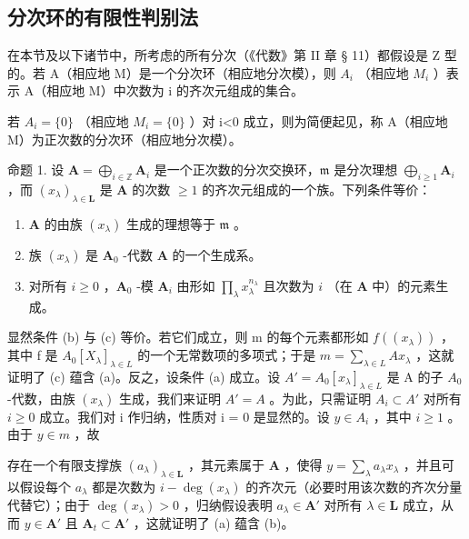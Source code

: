 \subsection{分次环的有限性判别法}

在本节及以下诸节中，所考虑的所有分次（《代数》第 II 章 § 11）都假设是 Z 型的。若 A（相应地 M）是一个分次环（相应地分次模），则 \(A_{i}\) （相应地 \(M_{i}\) ）表示 A（相应地 M）中次数为 i 的齐次元组成的集合。

若 \(A_{i}=\{0\}\) （相应地 \(M_{i}=\{0\}\) ）对 i\textless0 成立，则为简便起见，称 A（相应地 M）为正次数的分次环（相应地分次模）。

命题 1. 设 \(\mathbf{A} = \bigoplus_{i\in \mathbb{Z}}\mathbf{A}_i\) 是一个正次数的分次交换环，\(\mathfrak{m}\) 是分次理想 \(\bigoplus_{i\geqslant 1}\mathbf{A}_i\) ，而 \((x_{\lambda})_{\lambda \in \mathbf{L}}\) 是 \(\mathbf{A}\) 的次数 \(\geqslant 1\) 的齐次元组成的一个族。下列条件等价：

\begin{enumerate}
\def\labelenumi{(\alph{enumi})}
\item
  \(\mathbf{A}\) 的由族 \((x_{\lambda})\) 生成的理想等于 \(\mathfrak{m}\) 。
\item
  族 \((x_{\lambda})\) 是 \(\mathbf{A}_0\) -代数 \(\mathbf{A}\) 的一个生成系。
\item
  对所有 \(i \geqslant 0\) ，\(\mathbf{A}_0\) -模 \(\mathbf{A}_i\) 由形如 \(\prod_{\lambda} x_{\lambda}^{n_{\lambda}}\) 且次数为 \(i\) （在 \(\mathbf{A}\) 中）的元素生成。
\end{enumerate}

显然条件 (b) 与 (c) 等价。若它们成立，则 m 的每个元素都形如 \(f((x_{\lambda}))\) ，其中 f 是 \(A_{0}[X_{\lambda}]_{\lambda \in L}\) 的一个无常数项的多项式；于是 \(m = \sum_{\lambda \in L} Ax_{\lambda}\) ，这就证明了 (c) 蕴含 (a)。反之，设条件 (a) 成立。设 \(A' = A_{0}[x_{\lambda}]_{\lambda \in L}\) 是 A 的子 \(A_{0}\) -代数，由族 \((x_{\lambda})\) 生成，我们来证明 \(A' = A\) 。为此，只需证明 \(A_{i} \subset A'\) 对所有 \(i \geqslant 0\) 成立。我们对 i 作归纳，性质对 i = 0 是显然的。设 \(y \in A_{i}\) ，其中 \(i \geqslant 1\) 。由于 \(y \in m\) ，故

存在一个有限支撑族 \((a_{\lambda})_{\lambda \in \mathbf{L}}\) ，其元素属于 \(\mathbf{A}\) ，使得 \(y = \sum_{\lambda} a_{\lambda} x_{\lambda}\) ，并且可以假设每个 \(a_{\lambda}\) 都是次数为 \(i - \deg(x_{\lambda})\) 的齐次元（必要时用该次数的齐次分量代替它）；由于 \(\deg(x_{\lambda}) > 0\) ，归纳假设表明 \(a_{\lambda} \in \mathbf{A}'\) 对所有 \(\lambda \in \mathbf{L}\) 成立，从而 \(y \in \mathbf{A}'\) 且 \(\mathbf{A}_t \subset \mathbf{A}'\) ，这就证明了 (a) 蕴含 (b)。

